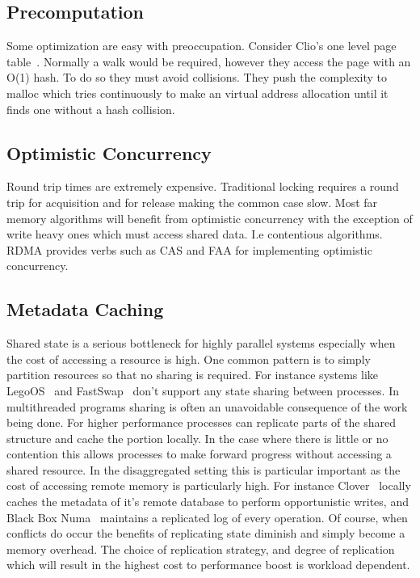 \subsection{Precomputation} Some optimization are easy with preoccupation. Consider
Clio's one level page table~\cite{clio}. Normally a walk would be required, however they
access the page with an O(1) hash. To do so they must avoid collisions. They
push the complexity to malloc which tries continuously to make an virtual address
allocation until it finds one without a hash collision.

\subsection{Optimistic Concurrency} Round trip times are extremely expensive.
Traditional locking requires a round trip for acquisition and for release making
the common case slow. Most far memory algorithms will benefit from optimistic
concurrency with the exception of write heavy ones which must access shared
data. I.e contentious algorithms. RDMA provides verbs such as CAS and FAA for
implementing optimistic concurrency.

\subsection{Metadata Caching}
Shared state is a serious bottleneck for highly parallel systems especially when
the cost of accessing a resource is high. One common pattern is to simply
partition resources so that no sharing is required. For instance systems like
LegoOS~\cite{legoos} and FastSwap~\cite{fastswap} don't support any state
sharing between processes. In multithreaded programs sharing is often an
unavoidable consequence of the work being done. For higher performance processes
can replicate parts of the shared structure and cache the portion locally. In
the case where there is little or no contention this allows processes to make
forward progress without accessing a shared resource. In the disaggregated
setting this is particular important as the cost of accessing remote memory is
particularly high. For instance Clover~\cite{clover} locally caches the metadata
of it's remote database to perform opportunistic writes, and Black Box
Numa~\cite{black-box-numa} maintains a replicated log of every operation. Of
course, when conflicts do occur the benefits of replicating state diminish and
simply become a memory overhead. The choice of replication strategy, and degree
of replication which will result in the highest cost to performance boost is
workload dependent.


